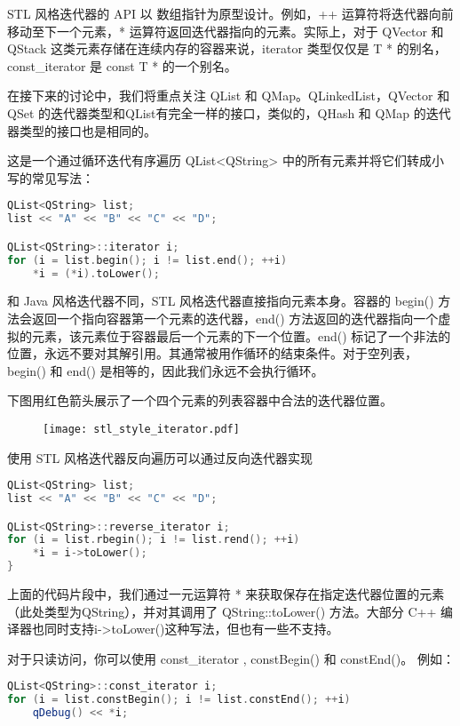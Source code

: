 STL 风格迭代器的 API 以 数组指针为原型设计。例如，++ 运算符将迭代器向前移动至下一个元素，* 运算符返回迭代器指向的元素。实际上，对于 QVector 和 QStack 这类元素存储在连续内存的容器来说，iterator 类型仅仅是 T * 的别名，const\_iterator 是 const T * 的一个别名。

在接下来的讨论中，我们将重点关注 QList 和 QMap。QLinkedList，QVector 和 QSet 的迭代器类型和QList有完全一样的接口，类似的，QHash 和 QMap 的迭代器类型的接口也是相同的。

这是一个通过循环迭代有序遍历 QList<QString> 中的所有元素并将它们转成小
写的常见写法：


\begin{lstlisting}[language=C++]
QList<QString> list;
list << "A" << "B" << "C" << "D";

QList<QString>::iterator i;
for (i = list.begin(); i != list.end(); ++i)
    *i = (*i).toLower();
\end{lstlisting}

和 Java 风格迭代器不同，STL 风格迭代器直接指向元素本身。容器的 begin() 方法会返回一个指向容器第一个元素的迭代器，end() 方法返回的迭代器指向一个虚拟的元素，该元素位于容器最后一个元素的下一个位置。end() 标记了一个非法的位置，永远不要对其解引用。其通常被用作循环的结束条件。对于空列表，begin() 和 end() 是相等的，因此我们永远不会执行循环。

下图用红色箭头展示了一个四个元素的列表容器中合法的迭代器位置。
\begin{figure}[hpt!]  
	\centering
    \texttt{[image: stl\_style\_iterator.pdf]}
\end{figure}

使用 STL 风格迭代器反向遍历可以通过反向迭代器实现

\begin{lstlisting}[language=C++]
QList<QString> list;
list << "A" << "B" << "C" << "D";

QList<QString>::reverse_iterator i;
for (i = list.rbegin(); i != list.rend(); ++i)
    *i = i->toLower();
}
\end{lstlisting}

上面的代码片段中，我们通过一元运算符 * 来获取保存在指定迭代器位置的元素（此处类型为QString），并对其调用了 QString::toLower() 方法。大部分 C++ 编译器也同时支持i->toLower()这种写法，但也有一些不支持。

对于只读访问，你可以使用 const\_iterator , constBegin() 和 constEnd()。
例如：

\begin{lstlisting}[language=C++]
QList<QString>::const_iterator i;
for (i = list.constBegin(); i != list.constEnd(); ++i)
    qDebug() << *i;
\end{lstlisting}

